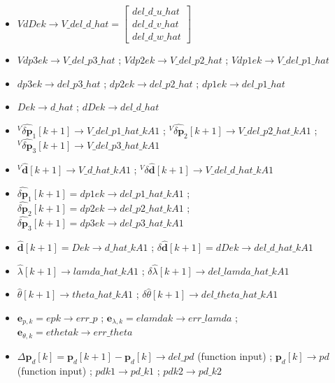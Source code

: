 \documentclass[UTF8,12pt,a4paper]{ctexart}
\begin{document}
\begin{itemize}[itemsep=6pt]
\item $VdDek \to V\_del\_d\_hat = \begin{bmatrix} del\_d\_u\_hat \\ del\_d\_v\_hat \\ del\_d\_w\_hat \end{bmatrix}$

\item $Vdp3ek \to V\_del\_p3\_hat$ \;;\; $Vdp2ek \to V\_del\_p2\_hat$ \;;\; $Vdp1ek \to V\_del\_p1\_hat$

\item $dp3ek \to del\_p3\_hat$ \;;\; $dp2ek \to del\_p2\_hat$ \;;\; $dp1ek \to del\_p1\_hat$

\item $Dek \to d\_hat$ \;;\; $dDek \to del\_d\_hat$

\item ${}^V\!\hat{\delta\mathbf{p}}_1[k\!+\!1] \to V\_del\_p1\_hat\_kA1$ \;;\;
${}^V\!\hat{\delta\mathbf{p}}_2[k\!+\!1] \to V\_del\_p2\_hat\_kA1$ \;;\;
${}^V\!\hat{\delta\mathbf{p}}_3[k\!+\!1] \to V\_del\_p3\_hat\_kA1$

\item ${}^V\!\hat{\mathbf{d}}[k+1] \to V\_d\_hat\_kA1$ \;;\;
${}^V\!\delta\hat{\mathbf{d}}[k+1] \to V\_del\_d\_hat\_kA1$

\item $\hat{\delta\mathbf{p}}_1[k\!+\!1] = dp1ek \to del\_p1\_hat\_kA1$ \;;\;
$\hat{\delta\mathbf{p}}_2[k\!+\!1] = dp2ek \to del\_p2\_hat\_kA1$ \;;\;
$\hat{\delta\mathbf{p}}_3[k\!+\!1] = dp3ek \to del\_p3\_hat\_kA1$

\item $\hat{\mathbf{d}}[k+1] = Dek \to d\_hat\_kA1$ \;;\;
$\delta\hat{\mathbf{d}}[k+1] = dDek \to del\_d\_hat\_kA1$

\item $\hat{\lambda}[k+1] \to lamda\_hat\_kA1$ \;;\;
$\delta\hat{\lambda}[k+1] \to del\_lamda\_hat\_kA1$

\item $\hat{\theta}[k+1] \to theta\_hat\_kA1$ \;;\;
$\delta\hat{\theta}[k+1] \to del\_theta\_hat\_kA1$

\item $\mathbf{e}_{p,k} = epk \to err\_p$ \;;\;
$\mathbf{e}_{\lambda,k} = elamdak \to err\_lamda$ \;;\;
$\mathbf{e}_{\theta,k} = ethetak \to err\_theta$

\item $\Delta\mathbf{p}_{d}[k] = \mathbf{p}_{d}[k\!+\!1] - \mathbf{p}_{d}[k] \to del\_pd$ (function input) \;;\;
$\mathbf{p}_{d}[k] \to pd$ (function input) \;;\;
$pdk1 \to pd\_k1$ \;;\; $pdk2 \to pd\_k2$


\end{itemize}
\end{document}
